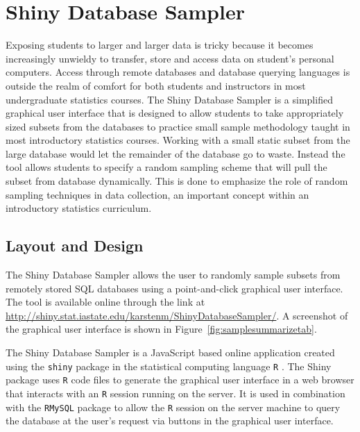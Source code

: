 \documentclass[11pt]{isuthesis}\usepackage[]{graphicx}\usepackage[]{color}
\begin{document}
\section{Shiny Database Sampler}

Exposing students to larger and larger data is tricky because it becomes increasingly unwieldy to transfer, store and access data on student's personal computers. Access through remote databases and database querying languages is outside the realm of comfort for both students and instructors in most undergraduate statistics courses. The Shiny Database Sampler is a simplified graphical user interface that is designed to allow students to take appropriately sized subsets from the databases to practice small sample methodology taught in most introductory statistics courses. Working with a small static subset from the large database would let the remainder of the database go to waste. Instead the tool allows students to specify a random sampling scheme that will pull the subset from database dynamically. This is done to emphasize the role of random sampling techniques in data collection, an important concept within an introductory statistics curriculum.

\subsection{Layout and Design}

The Shiny Database Sampler allows the user to randomly sample subsets from remotely stored SQL databases using a point-and-click graphical user interface. The tool is available online through the link at \url{http://shiny.stat.iastate.edu/karstenm/ShinyDatabaseSampler/}. A screenshot of the graphical user interface is shown in Figure~\ref{fig:samplesummarizetab}.  %

The Shiny Database Sampler is a JavaScript based online application created using the \texttt{shiny} package \citep{shiny} in the statistical computing language \texttt{R} \citep{R}. The Shiny package uses \texttt{R} code files to generate the graphical user interface in a web browser that interacts with an \texttt{R} session running on the server.  It is used in combination with the \texttt{RMySQL} package \citep{RMySQL} to allow the \texttt{R} session on the server machine to query the database at the user's request via buttons in the graphical user interface.
\end{document}
